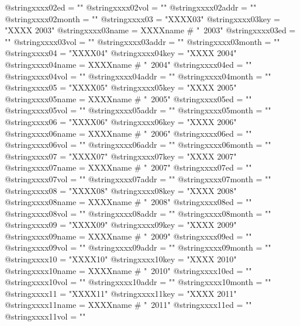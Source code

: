 @string{xxxx02ed =              ""}
@string{xxxx02vol =             ""}
@string{xxxx02addr =            ""}
@string{xxxx02month =           ""}
@string{xxxx03 =                "XXXX03"}
@string{xxxx03key =             "XXXX 2003"}
@string{xxxx03name =            XXXXname # "~2003"}
@string{xxxx03ed =              ""}
@string{xxxx03vol =             ""}
@string{xxxx03addr =            ""}
@string{xxxx03month =           ""}
@string{xxxx04 =                "XXXX04"}
@string{xxxx04key =             "XXXX 2004"}
@string{xxxx04name =            XXXXname # "~2004"}
@string{xxxx04ed =              ""}
@string{xxxx04vol =             ""}
@string{xxxx04addr =            ""}
@string{xxxx04month =           ""}
@string{xxxx05 =                "XXXX05"}
@string{xxxx05key =             "XXXX 2005"}
@string{xxxx05name =            XXXXname # "~2005"}
@string{xxxx05ed =              ""}
@string{xxxx05vol =             ""}
@string{xxxx05addr =            ""}
@string{xxxx05month =           ""}
@string{xxxx06 =                "XXXX06"}
@string{xxxx06key =             "XXXX 2006"}
@string{xxxx06name =            XXXXname # "~2006"}
@string{xxxx06ed =              ""}
@string{xxxx06vol =             ""}
@string{xxxx06addr =            ""}
@string{xxxx06month =           ""}
@string{xxxx07 =                "XXXX07"}
@string{xxxx07key =             "XXXX 2007"}
@string{xxxx07name =            XXXXname # "~2007"}
@string{xxxx07ed =              ""}
@string{xxxx07vol =             ""}
@string{xxxx07addr =            ""}
@string{xxxx07month =           ""}
@string{xxxx08 =                "XXXX08"}
@string{xxxx08key =             "XXXX 2008"}
@string{xxxx08name =            XXXXname # "~2008"}
@string{xxxx08ed =              ""}
@string{xxxx08vol =             ""}
@string{xxxx08addr =            ""}
@string{xxxx08month =           ""}
@string{xxxx09 =                "XXXX09"}
@string{xxxx09key =             "XXXX 2009"}
@string{xxxx09name =            XXXXname # "~2009"}
@string{xxxx09ed =              ""}
@string{xxxx09vol =             ""}
@string{xxxx09addr =            ""}
@string{xxxx09month =           ""}
@string{xxxx10 =                "XXXX10"}
@string{xxxx10key =             "XXXX 2010"}
@string{xxxx10name =            XXXXname # "~2010"}
@string{xxxx10ed =              ""}
@string{xxxx10vol =             ""}
@string{xxxx10addr =            ""}
@string{xxxx10month =           ""}
@string{xxxx11 =                "XXXX11"}
@string{xxxx11key =             "XXXX 2011"}
@string{xxxx11name =            XXXXname # "~2011"}
@string{xxxx11ed =              ""}
@string{xxxx11vol =             ""}
